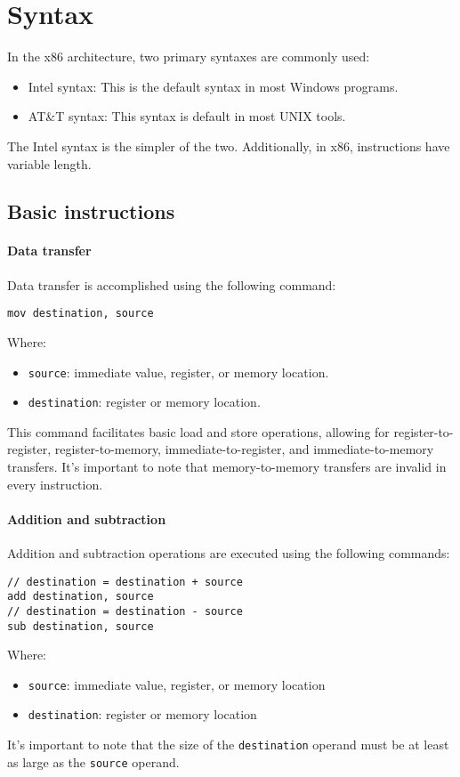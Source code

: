\section{Syntax}

In the x86 architecture, two primary syntaxes are commonly used:
\begin{itemize}
    \item Intel syntax: This is the default syntax in most Windows programs.
    \item AT\&T syntax: This syntax is default in most UNIX tools.
\end{itemize}
The Intel syntax is the simpler of the two. 
Additionally, in x86, instructions have variable length.

\subsection{Basic instructions}
\paragraph*{Data transfer}
Data transfer is accomplished using the following command:
\begin{verbatim}
mov destination, source
\end{verbatim}
Where:
\begin{itemize}
    \item \texttt{source}: immediate value, register, or memory location.
    \item \texttt{destination}: register or memory location.
\end{itemize}
This command facilitates basic load and store operations, allowing for register-to-register, register-to-memory, immediate-to-register, and immediate-to-memory transfers. 
It's important to note that memory-to-memory transfers are invalid in every instruction.

\paragraph*{Addition and subtraction}
Addition and subtraction operations are executed using the following commands:
\begin{verbatim}
// destination = destination + source
add destination, source
// destination = destination - source
sub destination, source
\end{verbatim}
Where: 
\begin{itemize}
    \item \texttt{source}: immediate value, register, or memory location
    \item \texttt{destination}: register or memory location
\end{itemize}
It's important to note that the size of the \texttt{destination} operand must be at least as large as the \texttt{source} operand.

